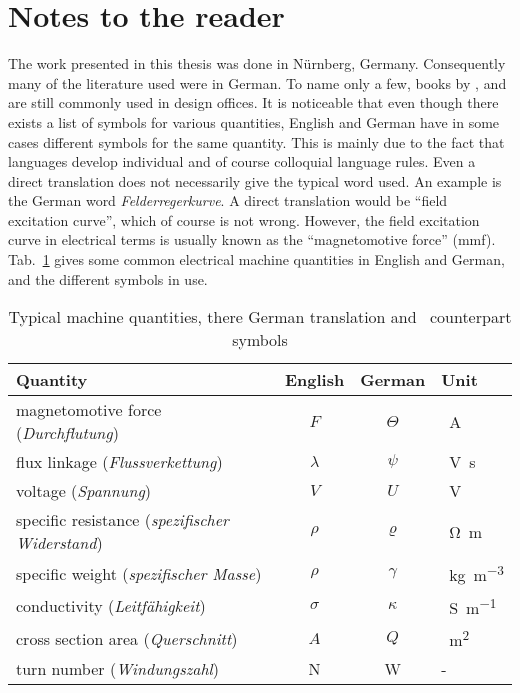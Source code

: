 \section{Notes to the reader}
The work presented in this thesis was done in Nürnberg, Germany. Consequently many of the literature used were in German. To name only a few, books by \cite{REF-00004}, \cite{REF-00429} and \cite{REF-00294} are still commonly used in design offices. It is noticeable that even though there exists a list of symbols for various quantities, English and German have in some cases different symbols for the same quantity. This is mainly due to the fact that languages develop individual and of course colloquial language rules. Even a direct translation does not necessarily give the typical word used. An example is the German word \textit{Felderregerkurve}. A direct translation would be ``field excitation curve'', which of course is not wrong. However, the field excitation curve in electrical terms is usually known as the ``magnetomotive force'' (mmf). Tab.~\ref{tab:translation} gives some common electrical machine quantities in English and German, and the different symbols in use.
\begin{table}[htbp]
  \caption[Typical machine quantities and their German translation]%
  {Typical machine quantities, there German translation and~%
  counterpart symbols}
  \label{tab:translation}
  \centering
  \begin{tabular}{lccl}
  \toprule
  Quantity   &  English  & German & Unit \\
  \toprule
  magnetomotive force (\textit{Durchflutung}) & 
  $F$& $\Theta$ & \SI{}{A}\\
  \midrule
  flux linkage (\textit{Flussverkettung}) & 
  $\lambda$& $\psi$ & \SI{}{V.s}   \\
  \midrule
  voltage (\textit{Spannung})  & 
  $V$& $U$ & \SI{}{V} \\
  \midrule
  specific resistance (\textit{spezifischer Widerstand})&
  $\rho$& $\varrho$ & \SI{}{\ohm.m} \\
  \midrule
  specific weight (\textit{spezifischer Masse})&
  $\rho$& $\gamma$& \SI{}{kg.m^{-3}}\\
  \midrule
  conductivity (\textit{Leitfähigkeit})&
  $\sigma$&$\kappa$& \SI{}{S.m^{-1}}\\
  \midrule
  cross section area (\textit{Querschnitt})&
  $A$&$Q$& \SI{}{m^{2}}\\
  \midrule
  turn number (\textit{Windungszahl}) & 
  N& W & - \\
  \bottomrule
  \end{tabular}
\end{table}

